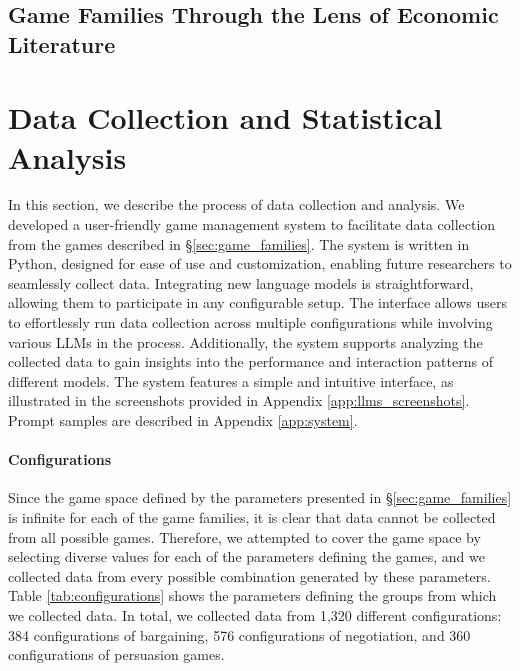 \subsection{Game Families Through the Lens of Economic Literature}
\label{app: games lit}


\section{Data Collection and Statistical Analysis}
\label{sec:data_collection}

In this section, we describe the process of data collection and analysis. We developed a user-friendly game management system to facilitate data collection from the games described in \S\ref{sec:game_families}. The system is written in Python, designed for ease of use and customization, enabling future researchers to seamlessly collect data. Integrating new language models is straightforward, allowing them to participate in any configurable setup. The interface allows users to effortlessly run data collection across multiple configurations while involving various LLMs in the process. Additionally, the system supports analyzing the collected data to gain insights into the performance and interaction patterns of different models. The system features a simple and intuitive interface, as illustrated in the screenshots provided in Appendix \ref{app:llms_screenshots}.
Prompt samples are described in Appendix \ref{app:system}.



\paragraph{Configurations} Since the game space defined by the parameters presented in \S\ref{sec:game_families} is infinite for each of the game families, it is clear that data cannot be collected from all possible games. Therefore, we attempted to cover the game space by selecting diverse values for each of the parameters defining the games, and we collected data from every possible combination generated by these parameters. Table \ref{tab:configurations} shows the parameters defining the groups from which we collected data. In total, we collected data from 1,320 different configurations: 384 configurations of bargaining, 576 configurations of negotiation, and 360 configurations of persuasion games.

